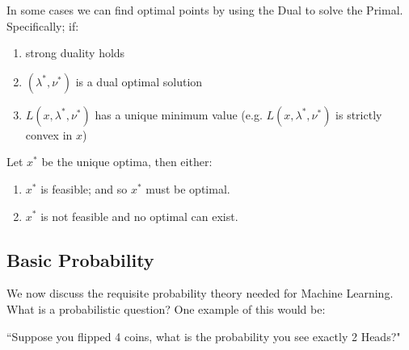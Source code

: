 \documentclass[]{article}
\theoremstyle{mattstyle}
\newtheorem{theorem}{Theorem}[section]
\theoremstyle{definition}
\begin{document}



In some cases we can find optimal points by using the Dual to solve the Primal. Specifically; if:
\begin{enumerate}
	\item strong duality holds
	\item $(\lambda^*, \nu^*)$ is a dual optimal solution
	\item $L(x, \lambda^*, \nu^*)$ has a unique minimum value (e.g. $L(x, \lambda^*, \nu^*)$ is strictly convex in $x$)
\end{enumerate}
Let $x^*$ be the unique optima, then either:
\begin{enumerate}
	\item $x^*$ is feasible; and so $x^*$ must be optimal.
	\item $x^*$ is not feasible and no optimal can exist.
\end{enumerate}

\newpage

\subsection{Basic Probability}

We now discuss the requisite probability theory needed for Machine Learning. What is a probabilistic question? One example of this would be:
\begin{center}
``Suppose you flipped 4 coins, what is the probability you see exactly 2 Heads?"
\end{center}
\end{document}
